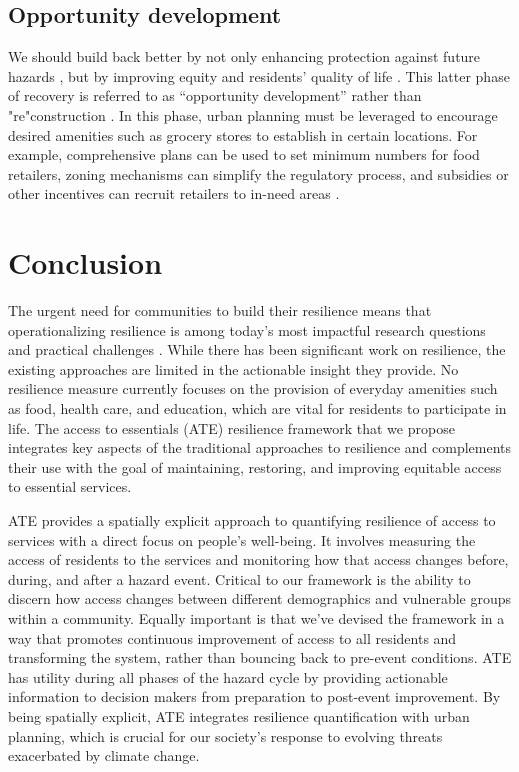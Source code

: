 \documentclass[9pt,twocolumn,twoside,lineno]{pnas-new}
\begin{document}
\subsection*{Opportunity development}
We should build back better \cite{Resendiz-Vazquez2019-ol} by not only enhancing protection against future hazards \cite{Platt2019-lx}, but by improving equity and residents’ quality of life \cite{Pantelic1991-qu}. 
This latter phase of recovery is referred to as “opportunity development” rather than "re"construction \cite{Resendiz-Vazquez2019-ol,Pantelic1991-qu}. 
In this phase, urban planning must be leveraged to encourage desired amenities such as grocery stores to establish in certain locations. 
For example, comprehensive plans can be used to set minimum numbers for food retailers, zoning mechanisms can simplify the regulatory process, and subsidies or other incentives can recruit retailers to in-need areas \cite{Raja2010-cm, Raja2008-wx}. 

\section*{Conclusion}
The urgent need for communities to build their resilience means that operationalizing resilience is among today's most impactful research questions and practical challenges \cite{Caldarice2019-tv}.
While there has been significant work on resilience, the existing approaches are limited in the actionable insight they provide.
No resilience measure currently focuses on the provision of everyday amenities such as food, health care, and education, which are vital for residents to participate in life.
The access to essentials (ATE) resilience framework that we propose integrates key aspects of the traditional approaches to resilience and complements their use with the goal of maintaining, restoring, and improving equitable access to essential services.

ATE provides a spatially explicit approach to quantifying resilience of access to services with a direct focus on people's well-being. 
It involves measuring the access of residents to the services and monitoring how that access changes before, during, and after a hazard event. 
Critical to our framework is the ability to discern how access changes between different demographics and vulnerable groups within a community.
Equally important is that we've devised the framework in a way that promotes continuous improvement of access to all residents and transforming the system, rather than bouncing back to pre-event conditions.
ATE has utility during all phases of the hazard cycle by providing actionable information to decision makers from preparation to post-event improvement.
By being spatially explicit, ATE integrates resilience quantification with urban planning, which is crucial for our society's response to evolving threats exacerbated by climate change.
\end{document}
